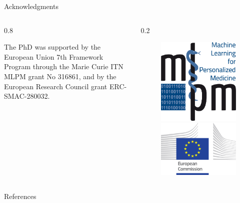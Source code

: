 \documentclass[xcolor=x11names,compress]{beamer}
\theoremstyle{plain}
\renewcommand{\(}{\begin{columns}}
\renewcommand{\)}{\end{columns}}
\newcommand{\<}[1]{\begin{column}{#1}}
\renewcommand{\>}{\end{column}}
\begin{document}
\begin{frame}{Acknowledgments}
	
	\([c]
	\<{0.8\linewidth}
		\begin{framed}
		The PhD was supported by the European Union 7th Framework Program through the Marie Curie ITN MLPM grant No 316861, and by the European Research Council grant ERC-SMAC-280032.
		\end{framed}
	\>
	\<{0.2\linewidth}
		\begin{figure}[t]
			\includegraphics[width=\columnwidth]{slides/logo-mlpm}\\
			\includegraphics[width=\columnwidth]{slides/logo_european_commission}
	\end{figure}
	\>
	\)
	
\end{frame}


\begin{frame}[allowframebreaks]{References}
	
	\tiny
	
	
	
\end{frame}
\end{document}
